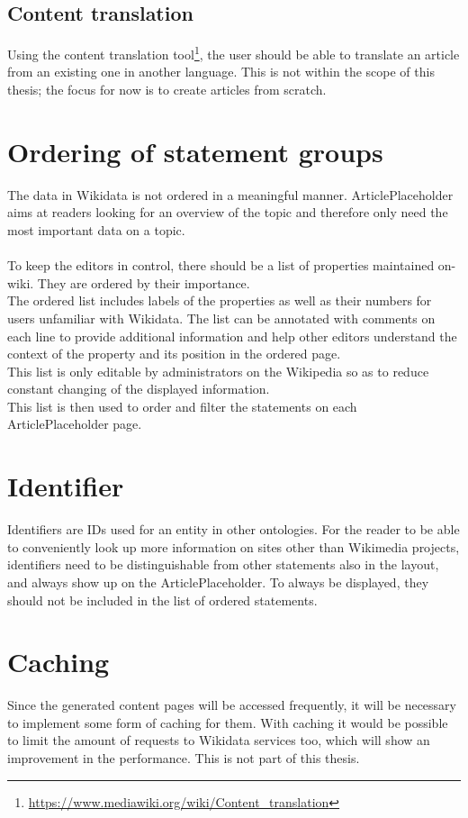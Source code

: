 \subsection{Content translation}
Using the content translation tool\footnote{\url{https://www.mediawiki.org/wiki/Content_translation}}, the user should be able to translate an article from an existing one in another language. This is not within the scope of this thesis; the focus for now is to create articles from scratch. \\

\section{Ordering of statement groups}
The data in Wikidata is not ordered in a meaningful manner. ArticlePlaceholder aims at readers looking for an overview of the topic and therefore only need the most important data on a topic. \\
\\
To keep the editors in control, there should be a list of properties maintained on-wiki. They are ordered by their importance. \\
The ordered list includes labels of the properties as well as their numbers for users unfamiliar with Wikidata. The list can be annotated with comments on each line to provide additional information and help other editors understand the context of the property and its position in the ordered page. \\
This list is only editable by administrators on the Wikipedia so as to reduce constant changing of the displayed information. \\
This list is then used to order and filter the statements on each ArticlePlaceholder page. 

\section {Identifier}
Identifiers are IDs used for an entity in other ontologies. For the reader to be able to conveniently look up more information on sites other than Wikimedia projects, identifiers need to be distinguishable from other statements also in the layout, and always show up on the ArticlePlaceholder. To always be displayed, they should not be included in the list of ordered statements. 

\section{Caching}
Since the generated content pages will be accessed frequently,  it will be necessary to implement some form of caching for them. With caching it would be possible to limit the amount of requests to Wikidata services too, which will show an improvement in the performance. This is not part of this thesis.

